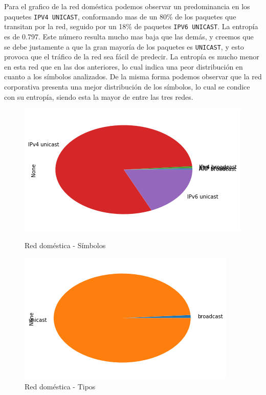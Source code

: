 Para el grafico de la red doméstica podemos observar un predominancia en los paquetes \texttt{IPV4 UNICAST}, conformando mas de un 80\% de los paquetes que transitan por la red, seguido por un 18\% de paquetes \texttt{IPV6 UNICAST}. La entropía es de 0.797. Este número resulta mucho mas baja que las demás, y creemos que se debe justamente a que la gran mayoría de los paquetes es \texttt{UNICAST}, y esto provoca que el tráfico de la red sea fácil de predecir. La entropía es mucho menor en esta red que en las dos anteriores, lo cual indica una peor distribución en cuanto a los símbolos analizados. De la misma forma podemos observar que la red corporativa presenta una mejor distribución de los símbolos, lo cual se condice con su entropía, siendo esta la mayor de entre las tres redes.

\begin{figure}[H]
	\begin{minipage}{0.49\textwidth}
		\centering
		\includegraphics[width=\linewidth]{imagenes/manu_casa_torta_simbolos}
		\caption{Red doméstica - Símbolos}
		\label{casa_torta_simb}
	\end{minipage}
	\begin{minipage}{0.49\textwidth}
		\centering
		\includegraphics[width=\linewidth]{imagenes/manu_casa_torta_tipos}
		\caption{Red doméstica - Tipos}
		\label{casa_torta_tipos}
	\end{minipage}
\end{figure}


